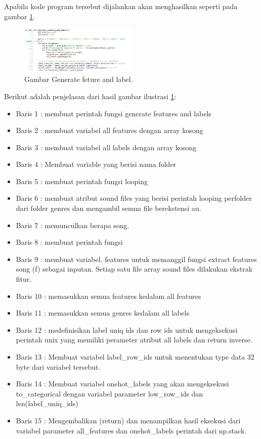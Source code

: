 \begin{enumerate}
	\par Apabila kode program tersebut dijalankan akan menghasilkan seperti pada gambar \ref{no12}.
		\begin{figure}[ht]
		\centerline{\includegraphics[width=0.5\textwidth]{figures/chapter6/no12.jpg}}
		\caption{Gambar Generate feture and label.}
		\label{no12}
		\end{figure}
	\par Berikut adalah penjelasan dari hasil gambar ilustrasi \ref{no12}:
	\begin{itemize}
	\item Baris 1 : membuat perintah fungsi generate features and labels
	\item Baris 2 : membuat variabel all features dengan array kosong
	\item Baris 3 : membuat variabel all labels dengan array kosong
	\item Baris 4 : Membuat variable yang berisi nama folder
	\item Baris 5 : membuat perintah fungsi looping
	\item Baris 6 : membuat atribut sound files yang berisi perintah looping perfolder dari folder genres dan mengambil semua file berekstensi au.
	\item Baris 7 : memunculkan berapa song.
	\item Baris 8 : membuat perintah fungsi
	\item Baris 9 : membuat variabel. features untuk memanggil fungsi extract features song (f) sebagai inputan. Setiap satu file array sound files dilakukan ekstrak fitur.
	\item Baris 10 : memasukkan semua features kedalam all features
	\item Baris 11 : memasukkan semua genres kedalam all labels
	\item Baris 12 : medefinisikan label uniq ids dan row ids untuk mengeksekusi perintah unix yang memiliki perameter atribut all labels dan return inverse.
	\item Baris 13 : Membuat variabel label\_row\_ids untuk menentukan type data 32 byte dari variabel tersebut.
	\item Baris 14 : Membuat variabel onehot\_labels yang akan mengeksekusi to\_categorical dengan variabel parameter low\_row\_ids dan len(label\_uniq\_ids)
	\item Baris 15 : Mengembalikan (return) dan menampilkan hasil eksekusi dari variabel parameter all\_features dan onehot\_labels perintah dari np.stack.
	\end{itemize}


\end{enumerate}
